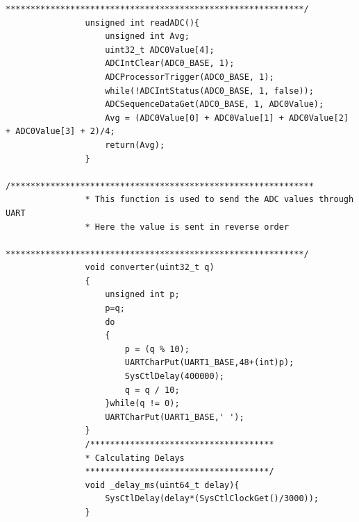 \documentclass[a4paper,12pt,oneside]{article}
\begin{document}
\begin{lstlisting}[style=CStyle]
				************************************************************/
				unsigned int readADC(){
					unsigned int Avg;
					uint32_t ADC0Value[4];
					ADCIntClear(ADC0_BASE, 1);
					ADCProcessorTrigger(ADC0_BASE, 1);
					while(!ADCIntStatus(ADC0_BASE, 1, false));
					ADCSequenceDataGet(ADC0_BASE, 1, ADC0Value);
					Avg = (ADC0Value[0] + ADC0Value[1] + ADC0Value[2] + ADC0Value[3] + 2)/4;
					return(Avg);
				}
				/*************************************************************
				* This function is used to send the ADC values through UART
				* Here the value is sent in reverse order
				************************************************************/
				void converter(uint32_t q)
				{
					unsigned int p;
					p=q;
					do
					{
						p = (q % 10);
						UARTCharPut(UART1_BASE,48+(int)p);
						SysCtlDelay(400000);
						q = q / 10;
					}while(q != 0);
					UARTCharPut(UART1_BASE,' ');
				}
				/*************************************
				* Calculating Delays
				*************************************/
				void _delay_ms(uint64_t delay){
					SysCtlDelay(delay*(SysCtlClockGet()/3000));
				}
			\end{lstlisting}
			
\end{document}
